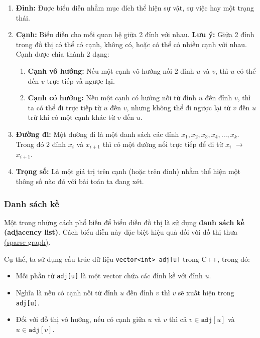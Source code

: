 \documentclass{article}
\begin{document}
\begin{enumerate}
    \item \textbf{Đỉnh:} Được biểu diễn nhằm mục đích thể hiện sự vật, sự việc hay một trạng thái.
    \item \textbf{Cạnh:} Biểu diễn cho mối quan hệ giữa 2 đỉnh với nhau. \textbf{Lưu ý:} Giữa 2 đỉnh trong đồ thị có thể có cạnh, không có, hoặc có thể có nhiều cạnh với nhau. Cạnh được chia thành 2 dạng:
    \begin{enumerate}
        \item \textbf{Cạnh vô hướng:} Nếu một cạnh vô hướng nối 2 đỉnh $u$ và $v$, thì $u$ có thể đến $v$ trực tiếp vầ ngược lại.
        \item \textbf{Cạnh có hướng:} Nếu một cạnh có hướng nối từ đỉnh $u$ đến đỉnh $v$, thì ta có thể đi trực tiếp từ $u$ đến $v$, nhưng không thể đi ngược lại từ $v$ đến $u$ trừ khi có một cạnh khác từ $v$ đến $u$.
    \end{enumerate}
    \item \textbf{Đường đi:} Một đường đi là một danh sách các đỉnh $x_1, x_2, x_3, x_4,\dots, x_k$. Trong đó 2 đỉnh $x_i$ và $x_{i + 1}$ thì có một đường nối trực tiếp để đi từ $x_i$ $\rightarrow$ $x_{i + 1}$.
    \item \textbf{Trọng số:} Là một giá trị trên cạnh (hoặc trên đỉnh) nhằm thể hiện một thông số nào đó với bài toán ta đang xét.
\end{enumerate}

\subsubsection{Danh sách kề}

Một trong những cách phổ biến để biểu diễn đồ thị là sử dụng \textbf{danh sách kề (adjacency list)}. Cách biểu diễn này đặc biệt hiệu quả đối với đồ thị thưa \href{https://en.m.wikipedia.org/wiki/Sparse_graph}{(sparse graph)}.


Cụ thể, ta sử dụng cấu trúc dữ liệu \texttt{vector<int> adj[u]} trong C++, trong đó:

\begin{itemize}
    \item Mỗi phần tử \texttt{adj[u]} là một vector chứa các đỉnh kề với đỉnh $u$.
    \item Nghĩa là nếu có cạnh nối từ đỉnh $u$ đến đỉnh $v$ thì $v$ sẽ xuất hiện trong \texttt{adj[u]}.
    \item Đối với đồ thị vô hướng, nếu có cạnh giữa $u$ và $v$ thì cả $v \in \texttt{adj}[u]$ và $u \in \texttt{adj}[v]$.
\end{itemize}
\end{document}
